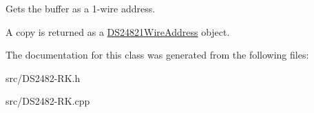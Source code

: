 Gets the buffer as a 1-\/wire address. 

A copy is returned as a \mbox{\hyperlink{class_d_s24821_wire_address}{D\+S24821\+Wire\+Address}} object. 

The documentation for this class was generated from the following files\+:\begin{DoxyCompactItemize}
\item 
src/D\+S2482-\/\+R\+K.\+h\item 
src/D\+S2482-\/\+R\+K.\+cpp\end{DoxyCompactItemize}

